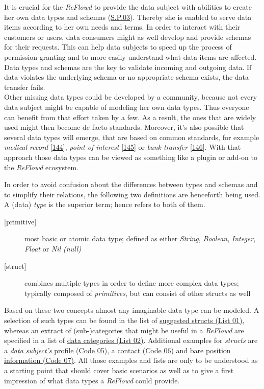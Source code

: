 \documentclass[12pt,english,a4paper,titlepage,cleardoublepage=empty,dottedtoc]{report}
\begin{document}
It is crucial for the \emph{ReFlowd} to provide the data subject with
abilities to create her own data types and schemas
(\protect\hyperlink{sp03}{S.P.03}). Thereby she is enabled to serve data
items according to her own needs and terms. In order to interact with
their customers or users, data consumers might as well develop and
provide schemas for their requests. This can help data subjects to speed
up the process of permission granting and to more easily understand what
data items are affected. Data types and schemas are the key to validate
incoming and outgoing data. If data violates the underlying schema or no
appropriate schema exists, the data transfer fails.\\
Other missing data types could be developed by a community, because not
every data subject might be capable of modeling her own data types. Thus
everyone can benefit from that effort taken by a few. As a result, the
ones that are widely used might then become de facto standards.
Moreover, it's also possible that several data types will emerge, that
are based on common standards, for example \emph{medical record}
{[}\protect\hyperlink{ref-web_spec_data-schemas_ehr}{144}{]},
\emph{point of interest}
{[}\protect\hyperlink{ref-web_spec_data-schemas_poi}{145}{]} or
\emph{bank transfer}
{[}\protect\hyperlink{ref-web_spec_data-schemas_bank-transfer}{146}{]}.
With that approach those data types can be viewed as something like a
plugin or add-on to the \emph{ReFlowd} ecosystem.

In order to avoid confusion about the differences between types and
schemas and to simplify their relations, the following two definitions
are henceforth being used. A (data) \emph{type} is the superior term;
hence refers to both of them.

\begin{description}
\item[{[}primitive{]}]
most basic or atomic data type; defined as either \emph{String},
\emph{Boolean}, \emph{Integer}, \emph{Float} or \emph{Nil (null)}
\item[{[}struct{]}]
combines multiple types in order to define more complex data types;
typically composed of \emph{primitives}, but can consist of other
structs as well
\end{description}

Based on these two concepts almost any imaginable data type can be
modeled. A selection of such types can be found in the list of
\protect\hyperlink{list-01_suggested-structs}{suggested structs (List
01)}, whereas an extract of (sub-)categories that might be useful in a
\emph{ReFlowd} are specified in a list of
\protect\hyperlink{list-02_data-categories}{data categories (List 02)}.
Additional examples for \emph{structs} are a
\protect\hyperlink{code-05_struct_profile}{\emph{data subject's} profile
(Code 05)}, a \protect\hyperlink{code-06_struct_contact}{contact (Code
06)} and bare \protect\hyperlink{code-07_struct_position}{position
information (Code 07)}. All those examples and lists are only to be
understood as a starting point that should cover basic scenarios as well
as to give a first impression of what data types a \emph{ReFlowd} could
provide.
\end{document}
